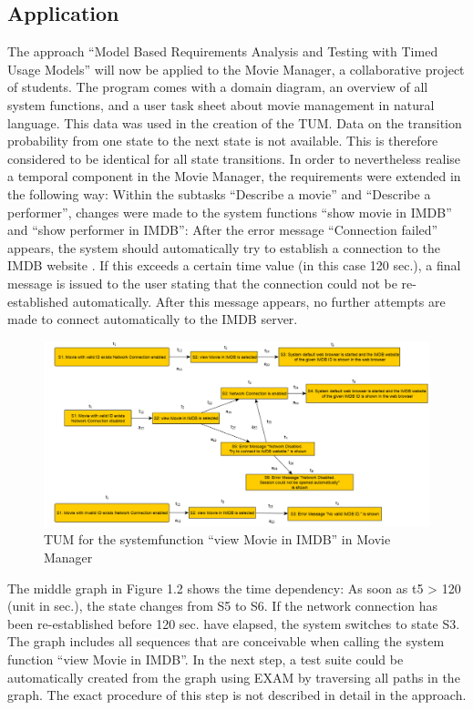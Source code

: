 \subsection{Application}

The approach \enquote{Model Based Requirements Analysis and Testing
with Timed Usage Models} will now be applied to the Movie Manager,
a collaborative project of students. The program comes with a domain
diagram, an overview of all system functions, and a user task sheet
about movie management in natural language. This data was used in
the creation of the TUM. Data on the transition probability from one
state to the next state is not available. This is therefore considered
to be identical for all state transitions. In order to nevertheless
realise a temporal component in the Movie Manager, the requirements
were extended in the following way: Within the subtasks \enquote{Describe
a movie} and \enquote{Describe a performer},
changes were made to the system functions \enquote{show movie
in IMDB} and \enquote{show performer in IMDB}:
After the error message \enquote{Connection failed}
appears, the system should automatically try to establish a connection
to the IMDB website \cite*{imdb}. If this exceeds a certain time
value (in this case 120 sec.), a final message is issued to the user
stating that the connection could not be re-established automatically.
After this message appears, no further attempts are made to connect
automatically to the IMDB server.

\begin{figure}[H]
	\centering
	\includegraphics[scale=0.7]{../images/Application1_MovieManager} 
	\caption{TUM for the systemfunction \enquote{view Movie in IMDB} in Movie Manager}
\end{figure}
\newpage
The middle graph in Figure 1.2 shows the time dependency: As soon
as t5 \textgreater{} 120 (unit in sec.), the state changes from
S5 to S6. If the network connection has been re-established before
120 sec. have elapsed, the system switches to state S3. The graph
includes all sequences that are conceivable when calling the system
function \enquote{view Movie in IMDB}. In the next
step, a test suite could be automatically created from the graph using
EXAM by traversing all paths in the graph. The exact procedure of
this step is not described in detail in the approach.

